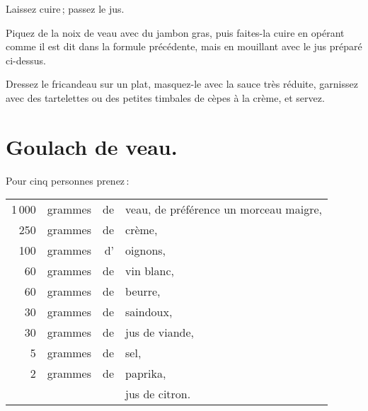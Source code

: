 Laissez cuire ; passez le jus.

Piquez de la noix de veau avec du jambon gras, puis faites-la cuire en opérant
comme il est dit dans la formule précédente, mais en mouillant avec le jus
préparé ci-dessus.

Dressez le fricandeau sur un plat, masquez-le avec la sauce très réduite,
garnissez avec des tartelettes ou des petites timbales de cèpes à la crème, et
servez.

\section*{\centering Goulach de veau.}
{}

Pour cinq personnes prenez :

\medskip

\footnotesize
\begin{longtable}{rrrp{16em}}
  1 000 & grammes & de & veau, de préférence un morceau maigre,                                           \\
    250 & grammes & de & crème,                                                                           \\
    100 & grammes & d' & oignons,                                                                         \\
     60 & grammes & de & vin blanc,                                                                       \\
     60 & grammes & de & beurre,                                                                          \\
     30 & grammes & de & saindoux,                                                                        \\
     30 & grammes & de & jus de viande,                                                                   \\
      5 & grammes & de & sel,                                                                             \\
      2 & grammes & de & paprika,                                                                         \\
        &         &    & jus de citron.                                                                   \\
\end{longtable}
\normalsize

